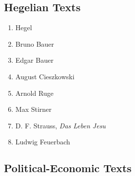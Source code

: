 \subsection{Hegelian Texts}

\begin{enumerate}
    \item Hegel
    \item Bruno Bauer
    \item Edgar Bauer
    \item August Cieszkowski
    \item Arnold Ruge
    \item Max Stirner
    \item D. F. Strauss, \textit{Das Leben Jesu}
    \item Ludwig Feuerbach
\end{enumerate}

\subsection{Political-Economic Texts}

